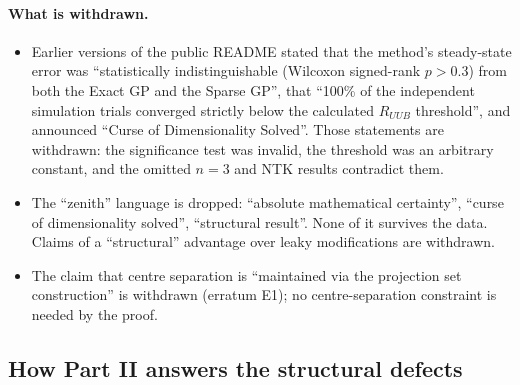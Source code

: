 \paragraph{What is withdrawn.}
\begin{itemize}
  \item Earlier versions of the public README stated that the method's steady-state error was ``statistically
    indistinguishable (Wilcoxon signed-rank $p > 0.3$) from both the Exact GP and the Sparse GP'', that ``100\% of the
    independent simulation trials converged strictly below the calculated $R_{UUB}$ threshold'', and announced
    ``Curse of Dimensionality Solved''. Those statements are withdrawn: the significance test was invalid, the threshold was an
    arbitrary constant, and the omitted $n = 3$ and NTK results contradict them.
  \item The ``zenith'' language is dropped: ``absolute mathematical certainty'', ``curse of dimensionality
    solved'', ``structural result''. None of it survives the data. Claims of a ``structural'' advantage over leaky
    modifications are withdrawn.
  \item The claim that centre separation is ``maintained via the projection set construction'' is withdrawn
    (erratum E1); no centre-separation constraint is needed by the proof.
\end{itemize}

\subsection{How Part II answers the structural defects}

